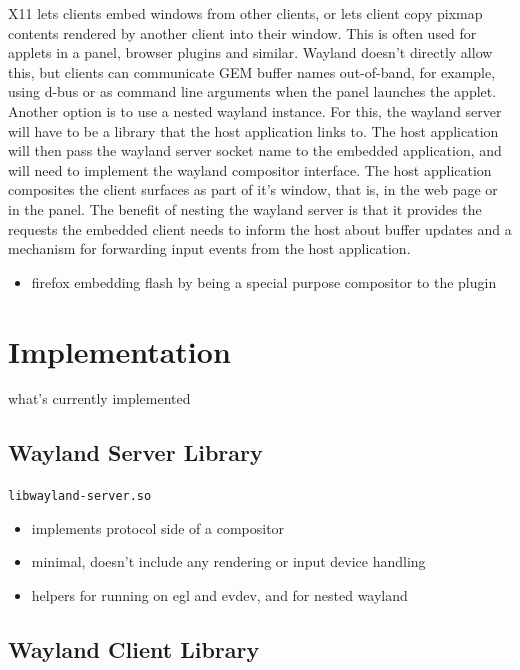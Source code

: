 \documentclass{article}
\begin{document}
X11 lets clients embed windows from other clients, or lets client copy
pixmap contents rendered by another client into their window.  This is
often used for applets in a panel, browser plugins and similar.
Wayland doesn't directly allow this, but clients can communicate GEM
buffer names out-of-band, for example, using d-bus or as command line
arguments when the panel launches the applet.  Another option is to
use a nested wayland instance.  For this, the wayland server will have
to be a library that the host application links to.  The host
application will then pass the wayland server socket name to the
embedded application, and will need to implement the wayland
compositor interface.  The host application composites the client
surfaces as part of it's window, that is, in the web page or in the
panel.  The benefit of nesting the wayland server is that it provides
the requests the embedded client needs to inform the host about buffer
updates and a mechanism for forwarding input events from the host
application.

\begin{itemize}
\item firefox embedding flash by being a special purpose compositor to
   the plugin
\end{itemize}

\section{Implementation}

what's currently implemented

\subsection{Wayland Server Library}

\texttt{libwayland-server.so}

\begin{itemize}
\item implements protocol side of a compositor
\item minimal, doesn't include any rendering or input device handling
\item helpers for running on egl and evdev, and for nested wayland
\end{itemize}

\subsection{Wayland Client Library}
\end{document}
